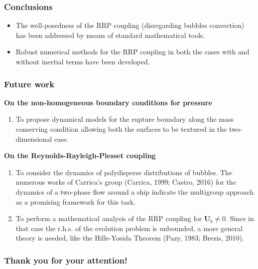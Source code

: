 \documentclass[10pt,aspectratio=169]{beamer}
\begin{document}
\begin{frame}
\frametitle{Conclusions}
\begin{itemize}
	\item The well-posedness of the RRP coupling (disregarding bubbles convection) has been addressed by means of standard mathematical tools.
	\item Robust numerical methods for the RRP coupling in both the cases with and without inertial terms have been developed.
\end{itemize}
\end{frame}  

\begin{frame}
\frametitle{Future work}
\vspace*{0.5cm}
\noindent\textbf{On the non-homogeneous boundary conditions for pressure}
\begin{enumerate}
	\item To propose dynamical models for the rupture boundary along the mass conserving condition allowing both the surfaces to be textured in the two-dimensional case.
\end{enumerate}

\noindent\textbf{On the Reynolds-Rayleigh-Plesset coupling}
\begin{enumerate}
	\item To consider the dynamics of polydisperse distributions of bubbles. The numerous works of Carrica's group (Carrica, 1999; Castro, 2016) for the dynamics of a two-phase flow around a ship indicate the multigroup approach as a promising framework for this task.%
	
	\item To perform a mathematical analysis of the RRP coupling for $\mathbf{U}_b\neq 0$. Since in that case the r.h.s. of the evolution problem is unbounded, a more general theory is needed, like the Hille-Yosida Theorem (Pazy, 1983; Brezis, 2010).
\end{enumerate}
\end{frame}  


\setcounter{showSlideNumbers}{0}
\begin{frame}[noframenumbering]
\frametitle{Thank you for your attention!}\centering


\end{frame}
\end{document}
